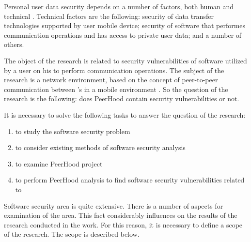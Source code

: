 %
Personal user data security depends on a number of factors, both human and technical . 
%
Technical factors are the following: security of data transfer technologies supported by user mobile device; security of software that performes communication operations and has access to private user data; and a number of others. 

%
The object of the research is related to security vulnerabilities of software utilized by a user on his  to perform communication operations. 
%
The subject of the research is a network environment, based on the concept of peer-to-peer communication between 's in a mobile environment . 
%
So the question of the research is the following: does PeerHood contain security vulnerabilities or not. 

%
It is necessary to solve the following tasks to answer the question of the research: 
\begin{enumerate}
	\item to study the software security problem
	\item to consider existing methods of software security analysis
	\item to examine PeerHood project
	\item to perform PeerHood analysis to find software security vulnerabilities related to 
\end{enumerate}

%
Software security area is quite extensive. 
%
There is a number of aspects for examination of the area. 
%
This fact considerably influences on the results of the research conducted in the work. 
%
For this reason, it is necessary to define a scope of the research. 
%
The scope is described below. 
